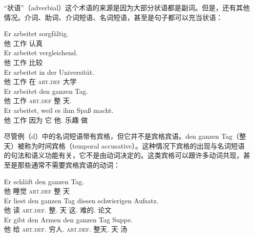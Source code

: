 “状语”（adverbial）这个术语的来源是因为大部分状语都是副词。但是，还有其他情况。介词、助词、介词短语、名词短语，甚至是句子都可以充当状语：

\eal
\ex 
\gll Er arbeitet sorgfältig.\\
	 他 工作 认真\\
\ex 
\gll Er arbeitet vergleichend.\\
	 他 工作 比较\\
\ex 
\gll Er arbeitet in der Universität.\\
	 他 工作 在 \textsc{art}.\textsc{def} 大学\\
\ex 
\gll Er arbeitet den ganzen Tag.\\
     他 工作 \textsc{art}.\textsc{def} 整 天.\acc\\
\ex 
\gll Er arbeitet, weil es ihm Spaß macht.\\
	 他 工作 因为 它 他.\dat{} 乐趣 做\\
\zl

\noindent
尽管例（d）中的名词短语带有宾格，但它并不是宾格宾语。den ganzen Tag（整天）被称为时间宾格（temporal accusative）。这种情况下宾格的出现与名词短语的句法和语义功能有关，它不是由动词决定的。这类宾格可以跟许多动词共现，甚至是那些通常不需要宾格宾语的动词：

\eal
\ex 
\gll Er schläft den ganzen Tag.\\
     他 睡觉 \textsc{art}.\textsc{def} 整 天\\
\ex 
\gll Er liest den ganzen Tag diesen schwierigen Aufsatz.\\
	 他 读 \textsc{art}.\textsc{def}.\acc{} 整.\acc{} 天 这.\acc{} 难的.\acc{} 论文\\
\ex 
\gll Er gibt den Armen den ganzen Tag Suppe.\\
	 他 给 \textsc{art}.\textsc{def}.\dat{} 穷人.\dat{} \textsc{art}.\textsc{def}.\acc{} 整天.\acc{} 天 汤\\
\zl

